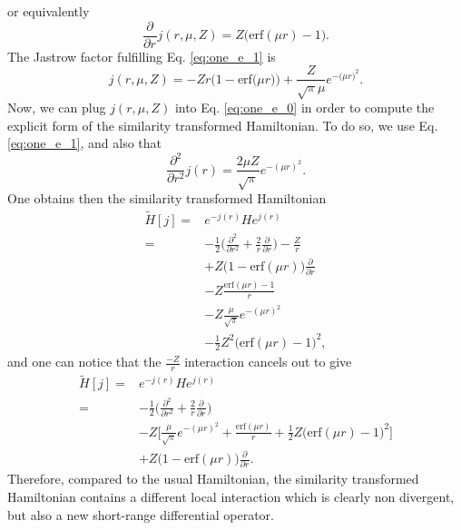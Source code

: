 \documentclass[aip,jcp,reprint,noshowkeys,superscriptaddress]{revtex4-1}
\newcommand{\deriv}[3]{\frac{\partial^{#3} #1}{\partial {#2}^{#3}}}
\begin{document}
or equivalently
\begin{equation}
 \label{eq:one_e_1}
 \deriv{}{r}{}j(r,\mu,Z) = Z\bigg( \text{erf}(\mu r) - 1\bigg).
\end{equation}
The Jastrow factor fulfilling Eq. \eqref{eq:one_e_1} is 
\begin{equation}
 \label{eq:one_e_2}
 j(r,\mu,Z) = -Z r \bigg( 1 - \text{erf}\big(\mu r\big) \bigg) + \frac{Z}{\sqrt{\pi}\mu} e^{-\big(\mu r \big)^2}. 
\end{equation}
Now, we can plug $j(r,\mu,Z)$ into Eq. \eqref{eq:one_e_0} in order to compute the explicit form of the similarity transformed Hamiltonian. 
To do so, we use Eq. \eqref{eq:one_e_1}, and also that 
\begin{equation}
 \deriv{}{r}{2}j(r) = \frac{2 \mu Z }{\sqrt{\pi}} e^{-(\mu r)^2}.
\end{equation}
One obtains then the similarity transformed Hamiltonian 
\begin{equation}
 \begin{aligned}
 \tilde{H}[j] = & e^{-j(r)} H e^{j(r)} \\
              = & -\frac{1}{2}\big( \deriv{}{r}{2} + \frac{2}{r} \deriv{}{r}{} \big) - \frac{Z}{r}  \\
                & + Z \bigg( 1 - \text{erf}(\mu r)\bigg) \deriv{}{r}{} \\
                & - Z \frac{\text{erf}(\mu r) - 1}{r} \\
                & -Z \frac{\mu}{\sqrt{\pi}} e^{-(\mu r)^2} \\
                & - \frac{1}{2}Z^2 \bigg( \text{erf}(\mu r) -1 \bigg)^2,
 \end{aligned}
\end{equation}
and one can notice that the $\frac{-Z}{r}$ interaction cancels out to give
\begin{equation}
 \label{eq:one_e_3}
 \begin{aligned}
 \tilde{H}[j] = & e^{-j(r)} H e^{j(r)} \\
              = & -\frac{1}{2}\big( \deriv{}{r}{2} + \frac{2}{r} \deriv{}{r}{} \big)  \\
                & -Z \bigg[ \frac{\mu}{\sqrt{\pi}} e^{-(\mu r)^2} + \frac{\text{erf}(\mu r)}{r} + \frac{1}{2}Z \bigg( \text{erf}(\mu r) -1 \bigg)^2 \bigg] \\
                & + Z \bigg( 1 - \text{erf}(\mu r)\bigg) \deriv{}{r}{}. 
 \end{aligned}
\end{equation}
Therefore, compared to the usual Hamiltonian, the similarity transformed Hamiltonian contains a different local interaction which is clearly non divergent, but also a new short-range differential operator. 
\end{document}
